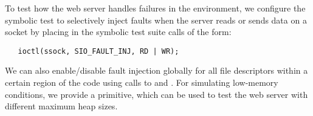 To test how the web server handles failures in the environment, we configure the symbolic test to selectively inject faults when the server reads or sends data on a socket by placing in the symbolic test suite calls of the form:
\begin{verbatim}
   ioctl(ssock, SIO_FAULT_INJ, RD | WR);
\end{verbatim}
We can also enable/disable fault injection globally for all file descriptors within a certain region of the code using calls to  and . For simulating low-memory conditions, we provide a  primitive, which can be used to test the web server with different maximum heap sizes.

